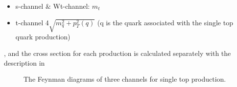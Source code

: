 \begin{itemize}
	\item s-channel $\&$ Wt-channel: $m_{t}$
	\item t-channel 4\times$\sqrt{m_{q}^2+p^2_{T}(q)}$ (q is the quark  associated with the single top quark production)
\end{itemize}
, and the cross section for each production is calculated separately with the description in 
\begin{figure}[htp]
	\centering
	\hfill
	\hfill
	\caption{The Feynman diagrams of three channels for single top production.}
	\label{Fig:singletop}
\end{figure}

